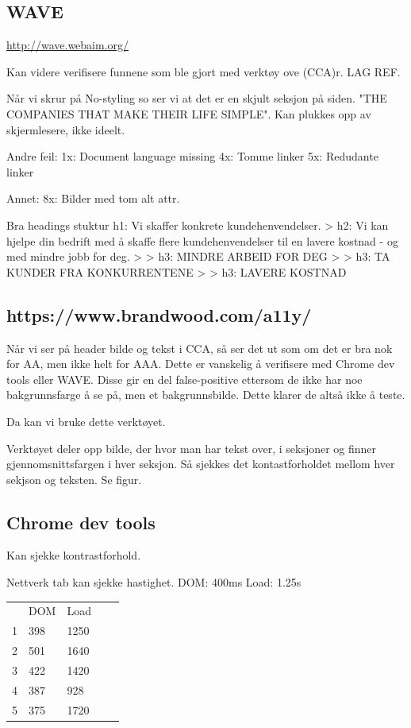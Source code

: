 \subsection{WAVE}
\url{http://wave.webaim.org/}

Kan videre verifisere funnene som ble gjort med verktøy ove (CCA)r. LAG REF.


Når vi skrur på No-styling so ser vi at det er en skjult seksjon på siden.
"THE COMPANIES THAT MAKE THEIR LIFE SIMPLE". Kan plukkes opp av skjermlesere, ikke ideelt.

Andre feil:
1x: Document language missing
4x: Tomme linker
5x: Redudante linker

Annet:
8x: Bilder med tom alt attr.

Bra headings stuktur 
h1: Vi skaffer konkrete kundehenvendelser.
> h2: Vi kan hjelpe din bedrift med å skaffe flere kundehenvendelser til en lavere kostnad - og med mindre jobb for deg.
> > h3: MINDRE ARBEID FOR DEG
> > h3: TA KUNDER FRA KONKURRENTENE
> > h3: LAVERE KOSTNAD


\subsection{https://www.brandwood.com/a11y/}

Når vi ser på header bilde og tekst i CCA, så ser det ut som om det er bra nok for AA, men ikke helt for AAA.
Dette er vanskelig å verifisere med Chrome dev tools eller WAVE. Disse gir en del false-positive ettersom de ikke har noe bakgrunnsfarge å se på, men et bakgrunnsbilde. Dette klarer de altså ikke å teste.

Da kan vi bruke dette verktøyet.

Verktøyet deler opp bilde, der hvor man har tekst over, i seksjoner og finner gjennomsnittsfargen i hver seksjon. Så sjekkes det kontastforholdet mellom hver sekjson og teksten.
Se figur.


\subsection{Chrome dev tools}
Kan sjekke kontrastforhold.

Nettverk tab kan sjekke hastighet.
DOM: 400ms
Load: 1.25s

\begin{table}[]
\begin{tabular}{lllll}
  & DOM & Load &  &  \\
1 & 398 & 1250 &  &  \\
2 & 501 & 1640 &  &  \\
3 & 422 & 1420 &  &  \\
4 & 387 &  928 &  &  \\
5 & 375 & 1720 &  & 
\end{tabular}
\end{table}


